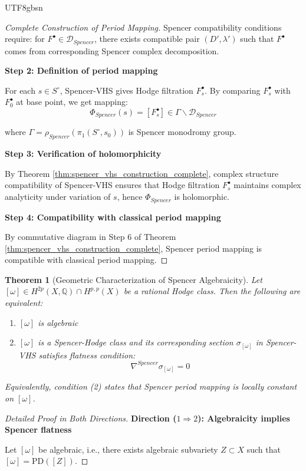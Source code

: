 \documentclass[a4paper,12pt]{extarticle}
\newtheorem{theorem}{Theorem}[section]
\theoremstyle{definition}
\begin{document}
\begin{CJK}{UTF8}{gbsn}
\begin{proof}[Complete Construction of Period Mapping]
Spencer compatibility conditions require: for $F^{\bullet} \in \mathcal{D}_{Spencer}$, there exists compatible pair $(D', \lambda')$ such that $F^{\bullet}$ comes from corresponding Spencer complex decomposition.

\textbf{Step 2: Definition of period mapping}

For each $s \in S^\circ$, Spencer-VHS gives Hodge filtration $F^{\bullet}_s$. By comparing $F^{\bullet}_s$ with $F^{\bullet}_0$ at base point, we get mapping:
$$\Phi_{Spencer}(s) = [F^{\bullet}_s] \in \Gamma \backslash \mathcal{D}_{Spencer}$$

where $\Gamma = \rho_{Spencer}(\pi_1(S^\circ, s_0))$ is Spencer monodromy group.

\textbf{Step 3: Verification of holomorphicity}

By Theorem \ref{thm:spencer_vhs_construction_complete}, complex structure compatibility of Spencer-VHS ensures that Hodge filtration $F^{\bullet}_s$ maintains complex analyticity under variation of $s$, hence $\Phi_{Spencer}$ is holomorphic.

\textbf{Step 4: Compatibility with classical period mapping}

By commutative diagram in Step 6 of Theorem \ref{thm:spencer_vhs_construction_complete}, Spencer period mapping is compatible with classical period mapping.
\end{proof}

\begin{theorem}[Geometric Characterization of Spencer Algebraicity]
\label{thm:spencer_algebraicity_geometric_complete}
Let $[\omega] \in H^{2p}(X, \mathbb{Q}) \cap H^{p,p}(X)$ be a rational Hodge class. Then the following are equivalent:
\begin{enumerate}
    \item $[\omega]$ is algebraic
    \item $[\omega]$ is a Spencer-Hodge class and its corresponding section $\sigma_{[\omega]}$ in Spencer-VHS satisfies flatness condition:
    $$\nabla^{Spencer} \sigma_{[\omega]} = 0$$
\end{enumerate}
Equivalently, condition (2) states that Spencer period mapping is locally constant on $[\omega]$.
\end{theorem}

\begin{proof}[Detailed Proof in Both Directions]
\textbf{Direction ($1 \Rightarrow 2$): Algebraicity implies Spencer flatness}

Let $[\omega]$ be algebraic, i.e., there exists algebraic subvariety $Z \subset X$ such that $[\omega] = \text{PD}([Z])$.


\end{proof}
\end{CJK}
\end{document}
